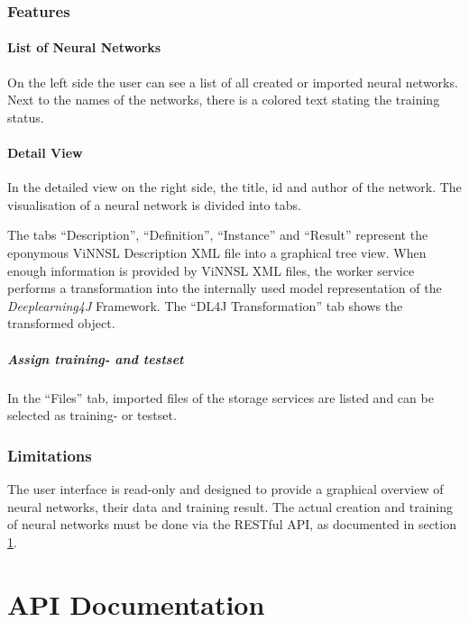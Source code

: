 \subsection{Features}\label{features}

\subsubsection{List of Neural Networks}\label{list-of-neural-networks}

On the left side the user can see a list of all created or imported
neural networks. Next to the names of the networks, there is a colored
text stating the training status.

\subsubsection{Detail View}\label{detail-view}

In the detailed view on the right side, the title, id and author of the
network. The visualisation of a neural network is divided into tabs.

The tabs ``Description'', ``Definition'', ``Instance'' and ``Result''
represent the eponymous ViNNSL Description XML file into a graphical
tree view. When enough information is provided by ViNNSL XML files, the
worker service performs a transformation into the internally used model
representation of the \emph{Deeplearning4J} Framework. The ``DL4J
Transformation'' tab shows the transformed object.

\paragraph{Assign training- and
testset}\label{assign-training--and-testset}

In the ``Files'' tab, imported files of the storage services are listed
and can be selected as training- or testset.

\subsection{Limitations}\label{limitations-1}

The user interface is read-only and designed to provide a graphical
overview of neural networks, their data and training result. The actual
creation and training of neural networks must be done via the RESTful
API, as documented in section \ref{api-documentation}.

\chapter{API Documentation}\label{api-documentation}

